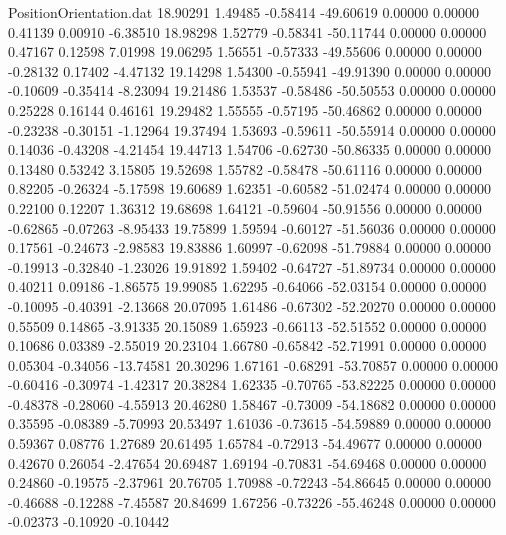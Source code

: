 \begin{filecontents}{PositionOrientation.dat}
  18.90291    1.49485   -0.58414   -49.60619    0.00000    0.00000    0.41139    0.00910   -6.38510
  18.98298    1.52779   -0.58341   -50.11744    0.00000    0.00000    0.47167    0.12598    7.01998
  19.06295    1.56551   -0.57333   -49.55606    0.00000    0.00000   -0.28132    0.17402   -4.47132
  19.14298    1.54300   -0.55941   -49.91390    0.00000    0.00000   -0.10609   -0.35414   -8.23094
  19.21486    1.53537   -0.58486   -50.50553    0.00000    0.00000    0.25228    0.16144    0.46161
  19.29482    1.55555   -0.57195   -50.46862    0.00000    0.00000   -0.23238   -0.30151   -1.12964
  19.37494    1.53693   -0.59611   -50.55914    0.00000    0.00000    0.14036   -0.43208   -4.21454
  19.44713    1.54706   -0.62730   -50.86335    0.00000    0.00000    0.13480    0.53242    3.15805
  19.52698    1.55782   -0.58478   -50.61116    0.00000    0.00000    0.82205   -0.26324   -5.17598
  19.60689    1.62351   -0.60582   -51.02474    0.00000    0.00000    0.22100    0.12207    1.36312
  19.68698    1.64121   -0.59604   -50.91556    0.00000    0.00000   -0.62865   -0.07263   -8.95433
  19.75899    1.59594   -0.60127   -51.56036    0.00000    0.00000    0.17561   -0.24673   -2.98583
  19.83886    1.60997   -0.62098   -51.79884    0.00000    0.00000   -0.19913   -0.32840   -1.23026
  19.91892    1.59402   -0.64727   -51.89734    0.00000    0.00000    0.40211    0.09186   -1.86575
  19.99085    1.62295   -0.64066   -52.03154    0.00000    0.00000   -0.10095   -0.40391   -2.13668
  20.07095    1.61486   -0.67302   -52.20270    0.00000    0.00000    0.55509    0.14865   -3.91335
  20.15089    1.65923   -0.66113   -52.51552    0.00000    0.00000    0.10686    0.03389   -2.55019
  20.23104    1.66780   -0.65842   -52.71991    0.00000    0.00000    0.05304   -0.34056  -13.74581
  20.30296    1.67161   -0.68291   -53.70857    0.00000    0.00000   -0.60416   -0.30974   -1.42317
  20.38284    1.62335   -0.70765   -53.82225    0.00000    0.00000   -0.48378   -0.28060   -4.55913
  20.46280    1.58467   -0.73009   -54.18682    0.00000    0.00000    0.35595   -0.08389   -5.70993
  20.53497    1.61036   -0.73615   -54.59889    0.00000    0.00000    0.59367    0.08776    1.27689
  20.61495    1.65784   -0.72913   -54.49677    0.00000    0.00000    0.42670    0.26054   -2.47654
  20.69487    1.69194   -0.70831   -54.69468    0.00000    0.00000    0.24860   -0.19575   -2.37961
  20.76705    1.70988   -0.72243   -54.86645    0.00000    0.00000   -0.46688   -0.12288   -7.45587
  20.84699    1.67256   -0.73226   -55.46248    0.00000    0.00000   -0.02373   -0.10920   -0.10442

\end{filecontents}
